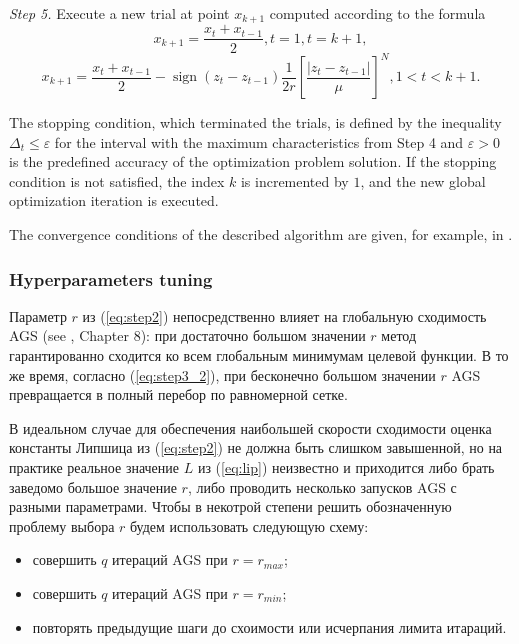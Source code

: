 \documentclass[runningheads]{llncs}
\DeclareMathOperator{\sign}{sign}
\begin{document}
\textit{Step 5.} Execute a new trial at point \(x_{k+1}\) computed according to the formula
\begin{displaymath}
x_{k+1}=\dfrac{x_{t}+x_{t-1}}{2},t=1,t=k+1,
\end{displaymath}
\begin{displaymath}
\label{step5}
x_{k+1}=\dfrac{x_{t}+x_{t-1}}{2}-\sign(z_{t}-z_{t-1})\dfrac{1}{2r}\left[\dfrac{|z_{t}-z_{t-1}|}{\mu}\right]^N,1<t<k+1.
\end{displaymath}

The stopping condition, which terminated the trials, is defined by the inequality
\(\Delta_{t}\leqslant \varepsilon\)
for the interval with the maximum characteristics from Step 4 and \(\varepsilon >0\) is the
predefined accuracy of the optimization problem solution. If the stopping condition is not satisfied,
the index \(k\) is incremented by \(1\), and the new global optimization iteration is executed.

The convergence conditions of the described algorithm are given, for example, in \cite{strSergGO}.

\subsubsection{Hyperparameters tuning}
Параметр $r$ из (\ref{eq:step2}) непосредственно влияет на глобальную сходимость AGS (see \cite{strSergGO}, Chapter 8):
при достаточно большом значении $r$ метод гарантированно сходится ко всем глобальным минимумам целевой функции.
В то же время, согласно (\ref{eq:step3_2}), при бесконечно большом значении $r$ AGS превращается в полный перебор
по равномерной сетке.

В идеальном случае для обеспечения наибольшей скорости сходимости оценка константы Липшица из (\ref{eq:step2})
не должна быть слишком завышенной, но на практике реальное значение $L$ из (\ref{eq:lip}) неизвестно и приходится
либо брать заведомо большое значение $r$, либо проводить несколько запусков AGS с разными параметрами. Чтобы в некотрой
степени решить обозначенную проблему выбора $r$ будем использовать следующую схему:
\begin{itemize}
  \item совершить $q$ итераций AGS при $r=r_{max}$;
  \item совершить $q$ итераций AGS при $r=r_{min}$;
  \item повторять предыдущие шаги до схоимости или исчерпания лимита итараций.
\end{itemize}
\end{document}
